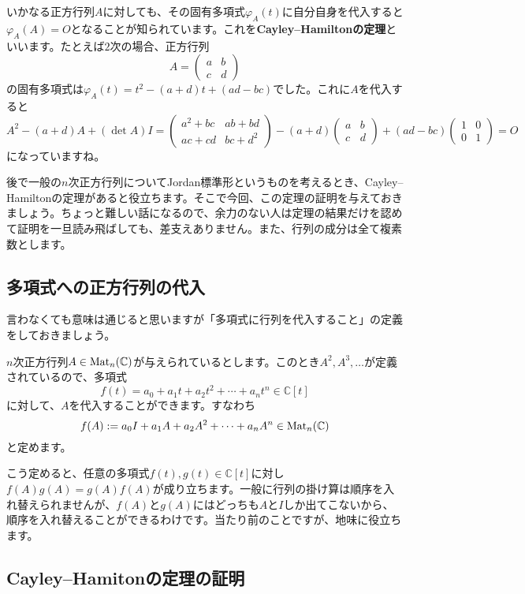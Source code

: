 いかなる正方行列$A$に対しても、その固有多項式$\varphi_A(t)$に自分自身を代入すると$\varphi_A(A) = O$となることが知られています。これを\textbf{Cayley--Hamiltonの定理}といいます。たとえば$2$次の場合、正方行列
\[
A = 
\begin{pmatrix}
a & b \\
c & d
\end{pmatrix}
\]
の固有多項式は$\varphi_A(t) = t^2 - (a + d)t + (ad - bc)$でした。これに$A$を代入すると
\[
A^2 - (a + d)A + (\det A)I
= 
\begin{pmatrix}
a^2 + bc & ab + bd \\
ac + cd & bc + d^2
\end{pmatrix}
- (a + d)
\begin{pmatrix}
a & b \\
c & d
\end{pmatrix}
+ (ad - bc)
\begin{pmatrix}
1 & 0 \\
0 & 1
\end{pmatrix}
= O
\]
になっていますね。

後で一般の$n$次正方行列についてJordan標準形というものを考えるとき、Cayley--Hamiltonの定理があると役立ちます。そこで今回、この定理の証明を与えておきましょう。ちょっと難しい話になるので、余力のない人は定理の結果だけを認めて証明を一旦読み飛ばしても、差支えありません。また、行列の成分は全て複素数とします。

\subsection{多項式への正方行列の代入}

言わなくても意味は通じると思いますが「多項式に行列を代入すること」の定義をしておきましょう。

$n$次正方行列$A \in \operatorname{Mat}_n(\mathbb{C})$が与えられているとします。このとき$A^2, A^3, \ldots$が定義されているので、多項式
\[
f(t) = a_0 + a_1 t + a_2 t^2 + \cdots + a_n t^n \in \mathbb{C}[t]
\]
に対して、$A$を代入することができます。すなわち
\[
f(A) := a_0 I + a_1 A + a_2 A^2 + \cdots + a_n A^n \in \operatorname{Mat}_n(\mathbb{C})
\]
と定めます。

こう定めると、任意の多項式$f(t), g(t) \in \mathbb{C}[t]$に対し$f(A)g(A) = g(A)f(A)$が成り立ちます。一般に行列の掛け算は順序を入れ替えられませんが、$f(A)$と$g(A)$にはどっちも$A$と$I$しか出てこないから、順序を入れ替えることができるわけです。当たり前のことですが、地味に役立ちます。

\subsection{Cayley--Hamitonの定理の証明}

